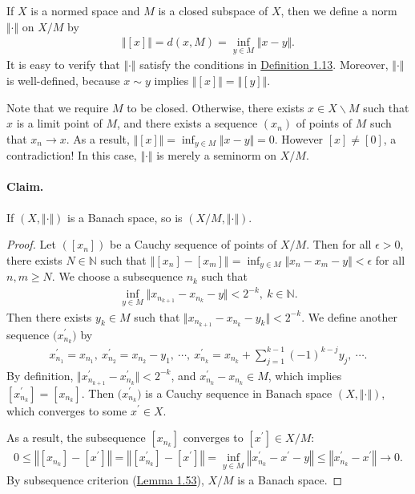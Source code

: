 \documentclass{article}
\begin{document}
If $X$ is a normed space and $M$ is a closed subspace of $X$, then we define a norm $\Vert\cdot\Vert$ on $X/M$ by
\begin{align*}
	\Vert [x]\Vert = d(x,M) = \inf_{y\in M}\Vert x-y\Vert.
\end{align*}
It is easy to verify that $\Vert\cdot\Vert$ satisfy the conditions in \hyperref[def:1.13]{Definition 1.13}. Moreover, $\Vert\cdot\Vert$ is well-defined, because $x\sim y$ implies $\Vert[x]\Vert=\Vert[y]\Vert$.
\vspace{0.1cm}

Note that we require $M$ to be closed. Otherwise, there exists $x\in X\backslash M$ such that $x$ is a limit point of $M$, and there exists a sequence $(x_n)$ of points of $M$ such that $x_n\to x$. As a result, $\Vert [x]\Vert = \inf_{y\in M}\Vert x-y\Vert = 0$. However $[x]\neq[0]$, a contradiction! In this case, $\Vert\cdot\Vert$ is merely a seminorm on $X/M$.

\paragraph{Claim.} If $(X,\Vert\cdot\Vert)$ is a Banach space, so is $(X/M,\Vert\cdot\Vert)$.
\begin{proof}
Let $([x_n])$ be a Cauchy sequence of points of $X/M$. Then for all $\epsilon>0$, there exists $N\in\mathbb{N}$ such that $\left\Vert [x_n] - [x_m]\right\Vert = \inf_{y\in M}\Vert x_n-x_m-y\Vert < \epsilon$ for all $n,m\geq N$. We choose a subsequence $n_k$ such that
\begin{align*}
	\inf_{y\in M}\Vert x_{n_{k+1}} - x_{n_k} - y\Vert < 2^{-k},\ k\in\mathbb{N}.
\end{align*}
Then there exists $y_k\in M$ such that $\Vert x_{n_{k+1}} - x_{n_k} - y_k\Vert < 2^{-k}$. We define another sequence $\bigl(x_{n_k}^\prime\bigr)$ by
\begin{align*}
	x_{n_1}^\prime=x_{n_1},\ x_{n_2}^\prime=x_{n_2} - y_1,\ \cdots,\  x_{n_k}^\prime=x_{n_k} + \sum_{j=1}^{k-1} (-1)^{k-j}y_j,\ \cdots.
\end{align*}
By definition, $\bigl\Vert x_{n_{k+1}}^\prime - x_{n_k}^\prime\bigr\Vert < 2^{-k}$, and $x_{n_k}^\prime - x_{n_k}\in M$, which implies $[x_{n_k}^\prime] = [x_{n_k}]$. Then $\bigl(x_{n_k}^\prime\bigr)$ is a Cauchy sequence in Banach space $(X,\Vert\cdot\Vert)$, which converges to some $x^\prime\in X$. 

As a result, the subsequence $[x_{n_k}]$ converges to $[x^\prime]\in X/M$:
\begin{align*}
	0\leq\left\Vert[x_{n_k}] - [x^\prime]\right\Vert = \left\Vert[x_{n_k}^\prime] - [x^\prime]\right\Vert = \inf_{y\in M}\left\Vert x_{n_k}^\prime - x^\prime - y\right\Vert \leq \left\Vert x_{n_k}^\prime - x^\prime\right\Vert \to 0.
\end{align*}
By subsequence criterion (\hyperref[lemma:1.53]{Lemma 1.53}), $X/M$ is a Banach space.
\end{proof}
\end{document}
